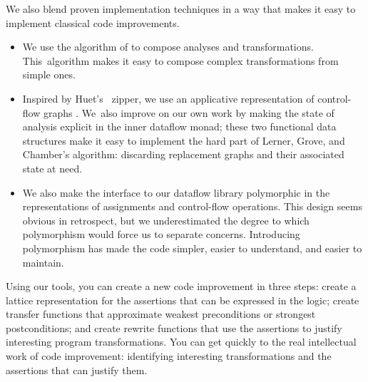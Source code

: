 \documentclass[blockstyle,preprint,natbib,nocopyrightspace]{sigplanconf}
\let\cite\citep
\def\finalremark#1{\relax}
\newcommand\secref[1]{Section~\ref{sec:#1}}
\begin{document}
We also blend proven implementation techniques
in a way that
makes it easy
to implement classical code improvements.
\begin{itemize}
\item
We use the algorithm of \citet{lerner-grove-chambers:2002} to 
compose analyses and transformations.
This~algorithm makes it easy to compose complex transformations
from simple ones.
\item
Inspired by Huet's~\citeyearpar{huet:zipper} zipper,
we use an applicative representation of
control-flow graphs
\cite{ramsey-dias:applicative-flow-graph}. 
We~also improve on our own work by making the state of analysis
explicit in the inner dataflow monad;
these two functional data structures make it easy to implement the hard
part of Lerner, Grove, and Chamber's algorithm: discarding replacement
graphs and their associated state at need.
%
%
\item
We also make 
the interface to our dataflow library polymorphic in the
representations of 
assignments and control-flow operations.
%
This design seems obvious in retrospect,
but we underestimated the degree to which polymorphism would force us to
separate concerns.
Introducing polymorphism has made the code simpler, easier
to understand, and easier to maintain.\finalremark
{SLPJ: Is it possible to substantiate this claim by examples?}
%
%
\end{itemize}
Using our tools,
you can create a new code improvement in three steps:
create a lattice representation for the assertions that can be
expressed in the logic;
create transfer functions that approximate weakest preconditions or
strongest postconditions;
and 
create rewrite functions that use the assertions to justify
interesting program transformations.  
You can get quickly to the real 
intellectual work of code improvement: identifying interesting
transformations and the assertions that can justify them.
\end{document}
